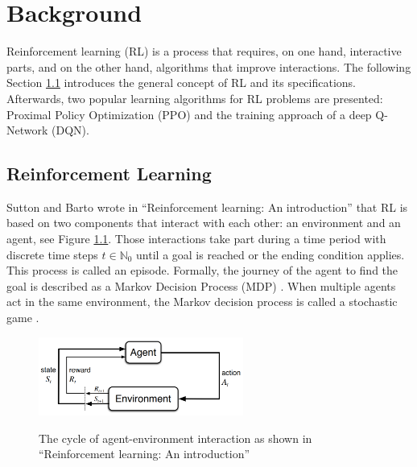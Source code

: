 \chapter{Background}\label{sec:Background}
Reinforcement learning (RL) is a process that requires, on one hand, interactive parts, and on the other hand, algorithms that improve interactions. The following Section \ref{reinforcement_learning} introduces the general concept of RL and its specifications. Afterwards, two popular learning algorithms for RL problems are presented: Proximal Policy Optimization (PPO) and the training approach of a deep Q-Network (DQN).

\section{Reinforcement Learning}\label{reinforcement_learning}
Sutton and Barto wrote in ``Reinforcement learning: An introduction'' \cite{suba18} that RL is based on two components that interact with each other: an environment and an agent, see Figure \ref{fig:rl_cycle}. Those interactions take part during a time period with discrete time steps $t\in\mathbb{N}_0$ until a goal is reached or the ending condition applies. This process is called an episode. Formally, the journey of the agent to find the goal is described as a Markov Decision Process (MDP) \cite{suba18}. 
When multiple agents act in the same environment, the Markov decision process is called a stochastic game \cite{buba10}.
\begin{figure}[hpbt]
    \centering
    \includegraphics[width=0.6\textwidth]{pictures/RLInteractionSB}\\
    \caption[Reinforcement Learning Cycle]{The cycle of agent-environment interaction as
        shown in ``Reinforcement learning: An introduction'' \cite{suba18}}\label{fig:rl_cycle}
\end{figure}

